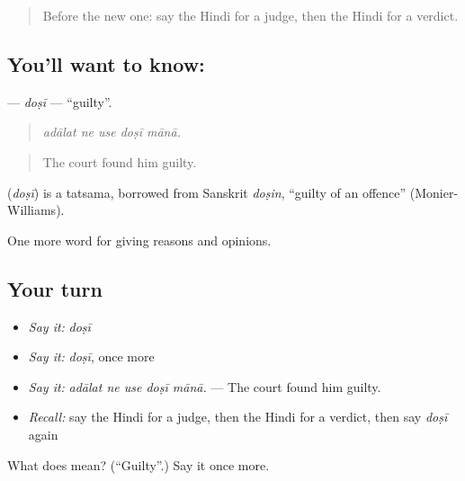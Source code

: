 \begin{quote}
Before the new one: say the Hindi for a judge, then the Hindi for a verdict.
\end{quote}

\subsection*{You'll want to know: }
\textbf{} — \emph{doṣī} — \textquotedblleft{}guilty\textquotedblright{}.

\begin{quote}
    
\end{quote}

\begin{quote}
\emph{adālat ne use doṣī mānā.}
\end{quote}

\begin{quote}
The court found him guilty.
\end{quote}

\begin{cousinweb}
\textbf{} (\emph{doṣī}) is a tatsama, borrowed from Sanskrit \emph{doṣin}, \textquotedblleft{}guilty of an offence\textquotedblright{} (Monier-Williams).
\end{cousinweb}

\begin{grammarlens}[title={What you've built}]
One more word for giving reasons and opinions.
\end{grammarlens}

\subsection*{Your turn}
\begin{itemize}
\raggedright
  \item \emph{Say it:} \emph{doṣī}
  \item \emph{Say it:} \emph{doṣī}, once more
  \item \emph{Say it:} \emph{adālat ne use doṣī mānā.} — The court found him guilty.
  \item \emph{Recall:} say the Hindi for a judge, then the Hindi for a verdict, then say \emph{doṣī} again
\end{itemize}

\begin{tcolorbox}[breakable,colback=teal!4,colframe=teal!35!black,title={Before you move on}]
What does  mean? (\textquotedblleft{}Guilty\textquotedblright{}.) Say it once more.
\end{tcolorbox}
